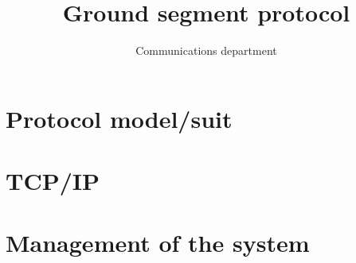 \documentclass[12pt,a4paper]{article}
\title{Ground segment protocol}
\author{Communications department}
\begin{document}
\maketitle
\tableofcontents
\section{Protocol model/suit}


\section{TCP/IP}


\section{Management of the system}


\cite{Synchronization2012}


\end{document}
